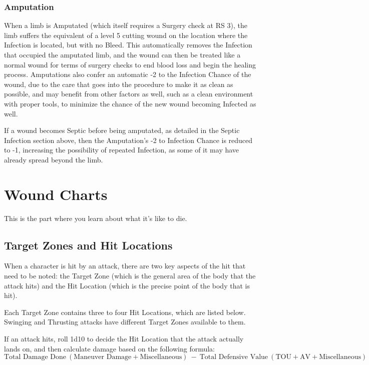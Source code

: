 \documentclass[oneside,11pt,english]{book}
\begin{document}
\subsection{Amputation}
When a limb is Amputated (which itself requires a Surgery check at RS 3), the limb suffers the equivalent 
of a level 5 cutting wound on the location where the Infection is located, but with no Bleed. This 
automatically removes the Infection that occupied the amputated limb, and the wound can then be treated 
like a normal wound for terms of surgery checks to end blood loss and begin the healing process. 
Amputations also confer an automatic -2 to the Infection Chance of the wound, due to the care that goes 
into the procedure to make it as clean as possible, and may benefit from other factors as well, such as a 
clean environment with proper tools, to minimize the chance of the new wound becoming Infected as 
well.

If a wound becomes Septic before being amputated, as detailed in the Septic Infection section above, then 
the Amputation’s -2 to Infection Chance is reduced to -1, increasing the possibility of repeated Infection, 
as some of it may have already spread beyond the limb. 

\chapter{Wound Charts}\label{ch:Damage Tables}
\startcontents[chapters]
\clearpage
\begin{center}
	This is the part where you learn about what it’s like to die.
\end{center}

\section{Target Zones and Hit Locations}
When a character is hit by an attack, there are two key aspects of the hit that need to be noted: the Target 
Zone (which is the general area of the body that the attack hits) and the Hit Location (which is the precise point of the body that is hit).

Each Target Zone contains three to four Hit Locations, which are listed below. Swinging and Thrusting attacks have different Target Zones available to them.

If an attack hits, roll 1d10 to decide the Hit Location that the attack actually lands on, and then calculate 
damage based on the following formula: 
\[\text{Total Damage Done}~(\text{Maneuver Damage}+\text{Miscellaneous}) ~-~ \text{Total Defensive Value}~(\text{TOU}+\text{AV} + \text{Miscellaneous})\]
\end{document}
